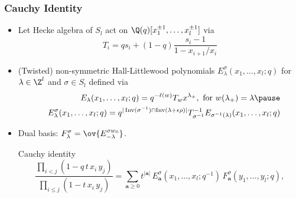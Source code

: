 \documentclass{beamer}
\newcommand{\Lcal}{{\mathcal L}}
\newcommand{\aA}{{\mathbf a}}
\DeclareMathOperator{\Inv}{Inv}
\newcounter{c}
\begin{document}
\begin{frame}
  \frametitle{Cauchy Identity}
  \begin{itemize}
  \item Let Hecke algebra of \(S_l\) act on \(\Q(q)[x_1^{\pm 1},
    \ldots, x_l^{\pm 1}]\) via \[
      T_i = qs_i+(1-q)\frac{s_i-1}{1-x_{i+1}/x_i}
    \]\pause
  \item (Twisted) non-symmetric Hall-Littlewood polynomials
    \(E_\lambda^\sigma(x_1,\ldots,x_l;q)\) for \(\lambda \in \Z^l\)
    and \(\sigma \in S_l\) defined via\pause
    \begin{eqnarray*}
      && E_\lambda(x_1,\ldots,x_l;q)  = q^{-\ell(w)} T_w
         x^{\lambda_+}, \text{ for }w(\lambda_+) = \lambda \pause\\
&& E^{\sigma }_{\lambda }(x_1,\ldots,x_l;q)  = q^{|\Inv (\sigma ^{-1})\cap \Inv
(\lambda +\epsilon \rho )|} T_{\sigma ^{-1}}^{-1} E_{\sigma
^{-1}(\lambda
)}(x_1,\ldots,x_l;q)
    \end{eqnarray*}
    \pause
  \item Dual basis: \(F_\lambda^\sigma = \ov{E_{-\lambda}^{\sigma w_0}}\).\pause
    \begin{block}{Cauchy identity}
      \[ \frac{\prod _{i<j} (1 - q\, t\, x_{i} \, y_{j})}{\prod
          _{i\leq j} (1 - t\, x_{i}\, y_{j})} = \sum _{\aA \geq 0}
        t^{|\aA |}\, E^{\sigma }_{\aA }(x_{1},\ldots,x_{l};q^{-1}) \,
        F^{\sigma }_{\aA }(y_{1},\ldots,y_{l};q),
      \]
    \end{block}
  \end{itemize}
\end{frame}
\end{document}
